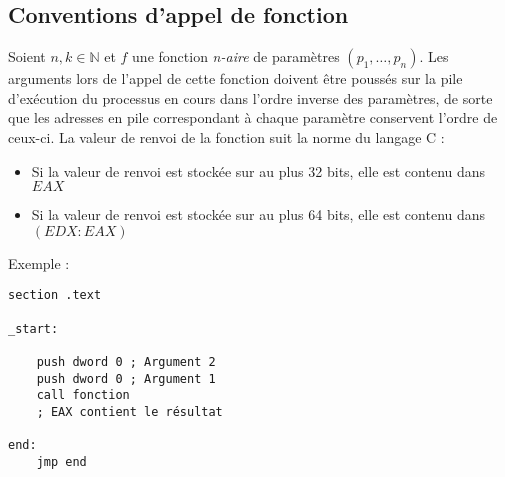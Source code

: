 \documentclass{book}
\newcommand*{\jumpline}{\newline \newline}
\begin{document}
\subsection{Conventions d'appel de fonction}
Soient $n, k\in{\mathbb{N}}$ et $f$ une fonction \textit{n-aire} de paramètres $(p_{1}, \dots, p_{n})$.\newline
Les arguments lors de l'appel de cette fonction doivent être poussés sur la pile d'exécution du processus en cours dans l'ordre inverse des paramètres, de sorte que les adresses en pile correspondant à chaque paramètre conservent l'ordre de ceux-ci.
\jumpline
La valeur de renvoi de la fonction suit la norme du langage C :
\begin{itemize}
	\item Si la valeur de renvoi est stockée sur au plus 32 bits, elle est contenu dans $EAX$
	\item Si la valeur de renvoi est stockée sur au plus 64 bits, elle est contenu dans $(EDX:EAX)$
\end{itemize}
Exemple :
\begin{verbatim}
section .text

_start:

	push dword 0 ; Argument 2
	push dword 0 ; Argument 1
	call fonction
	; EAX contient le résultat

end:
	jmp end
\end{verbatim}
\end{document}
